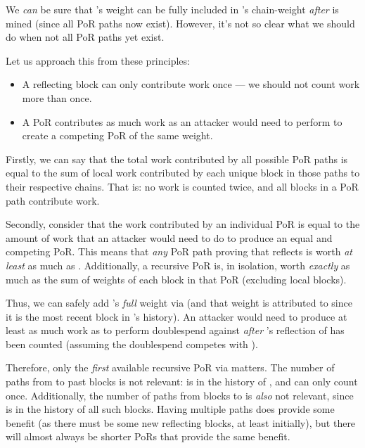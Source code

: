 We \emph{can} be sure that 's weight can be fully included in \cL's chain-weight \emph{after}  is mined (since all PoR paths now exist).
However, it's not so clear what we should do when not all PoR paths yet exist.

Let us approach this from these principles:
\begin{itemize}
    \item A reflecting block can only contribute work once --- we should not count work more than once.
    \item A PoR contributes as much work as an attacker would need to perform to create a competing PoR of the same weight.
\end{itemize}

Firstly, we can say that the total work contributed by all possible PoR paths is equal to the sum of local work contributed by each unique block in those paths to their respective chains.
That is: no work is counted twice, and all blocks in a PoR path contribute work.

Secondly, consider that the work contributed by an individual PoR is equal to the amount of work that an attacker would need to do to produce an equal and competing PoR.
This means that \emph{any} PoR path proving that  reflects  is worth \emph{at least} as much as .
Additionally, a recursive PoR is, in isolation, worth \emph{exactly} as much as the sum of weights of each block in that PoR (excluding local blocks).

Thus, we can safely add 's \emph{full} weight via  (and that weight is attributed to  since it is the most recent \cL block in 's history).
An attacker would need to produce at least as much work as  to perform doublespend against \cL \emph{after} 's reflection of  has been counted (assuming the doublespend competes with ).

Therefore, only the \emph{first} available recursive PoR via  matters.
The number of paths from  to past \cL blocks is not relevant: \BL{} is in the history of , and  can only count once.
Additionally, the number of paths from \cL blocks to  is \emph{also} not relevant, since  is in the history of all such blocks.
Having multiple paths does provide some benefit (as there must be some new reflecting blocks, at least initially), but there will almost always be shorter PoRs that provide the same benefit.

